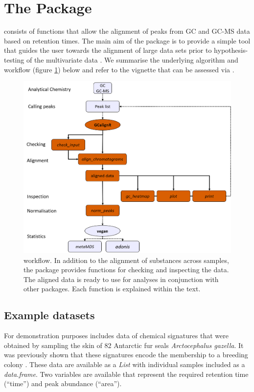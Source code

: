 \section{The Package}

 consists of functions that allow the alignment of peaks
from GC and GC-MS data based on retention times. The main aim of the
package is to provide a simple tool that guides the user towards the
alignment of large data sets prior to hypothesis-testing of the
multivariate data \citep{Anderson.2001}. We summarise the underlying
algorithm and workflow (figure \ref{figure:workflow}) below and refer to
the vignette that can be assessed via
.

\begin{figure}[htbp]
  \centering
  \includegraphics[width=13cm]{figures/workflow}
  \caption{ workflow. In addition to the alignment of substances across samples, the package provides functions for checking and inspecting the data. The aligned data is ready to use for analyses in conjunction with other packages. Each function is explained within the text.}
  \label{figure:workflow}
\end{figure}

\subsection{Example datasets}

For demonstration purposes  includes data of chemical
signatures that were obtained by sampling the skin of 82 Antarctic fur
seals \textit{Arctocephalus gazella}. It was previously shown that these
signatures encode the membership to a breeding colony
\cite{Stoffel.2015}. These data are available as a \emph{List} with
individual samples included as a \emph{data.frame}. Two variables are
available that represent the required retention time (``time'') and peak
abundance (``area'').

